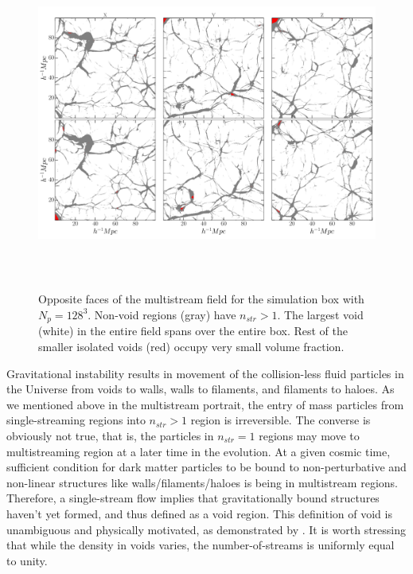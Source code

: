 \documentclass[fleqn,usenatbib,useAMS]{mnras}
\begin{document}
\begin{figure}
\begin{minipage}[t]{0.99\linewidth}
 \centering\includegraphics[height=11cm]{fig2.pdf} 
\end{minipage}\hfill
\caption{Opposite faces of the multistream field for the simulation box with $N_p = 128^3$. Non-void regions (gray) have $n_{str} > 1$. The largest void (white) in the entire field spans over the entire box. Rest of the smaller isolated voids (red) occupy very small volume fraction. }
\label{fig:voidFace}
\end{figure}


Gravitational instability results in movement of the collision-less fluid particles in the Universe from voids to walls, walls to filaments, and filaments to haloes. As we mentioned above in the multistream portrait, the entry of mass particles from single-streaming regions into $n_{str} > 1$ region is irreversible. The converse is obviously not true, that is, the particles in $n_{str} = 1$ regions may move to multistreaming region at a later time in the evolution. At a given cosmic time, sufficient condition for dark matter particles to be bound to non-perturbative and non-linear structures like walls/filaments/haloes is being in multistream regions. Therefore, a single-stream flow implies that gravitationally bound structures haven't yet formed, and thus defined as a void region. This definition of void is unambiguous and physically motivated, as demonstrated by \cite{Shandarin2012}. It is worth stressing that while the density in voids varies, the number-of-streams is uniformly equal to unity.
\end{document}
